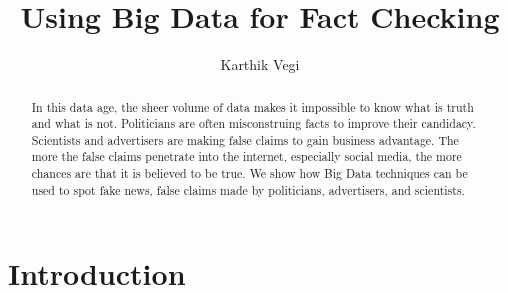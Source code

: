 \documentclass[sigconf]{acmart}
\begin{document}
\title{Using Big Data for Fact Checking}

\author{Karthik Vegi}


\renewcommand{\shortauthors}{kvegi}


\begin{abstract}
In this data age, the sheer volume of data makes it impossible to know what is truth and what is not. Politicians are often misconstruing facts to improve their candidacy. Scientists and advertisers are making false claims to gain business advantage.  The more the false claims penetrate into the internet, especially social media, the more chances are that it is believed to be true. We show how Big Data techniques can be used to spot fake news, false claims made by politicians, advertisers, and scientists.
\end{abstract}


\maketitle

\section{Introduction}
\end{document}
